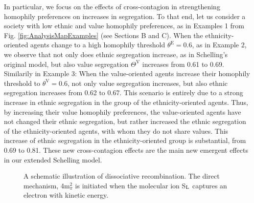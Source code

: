 \documentclass{ws-acs}
\begin{document}
{In particular, we focus on the effects of cross-contagion in strengthening homophily preferences on increases in segregation. To that end, let us consider a society with low ethnic and value homophily preferences, as in Examples 1 from Fig. \ref{fig:AnalysisMapExamples} (see Sections B and C). When the ethnicity-oriented agents change to a high homophily threshold $\theta^\text{E} = 0.6$, as in Example 2, we observe that not only does ethnic segregation increase, as in Schelling's original model, but also value segregation $\Theta^\text{V}$ increases from 0.61 to 0.69. 
Similarily in Example 3: When the value-oriented agents increase their homophily threshold to $\theta^\text{V} = 0.6$, not only value segregation increases, but also ethnic segregation increases from 0.62 to 0.67. This scenario is entirely due to a strong increase in ethnic segregation in the group of the ethnicity-oriented agents. Thus, by increasing their value homophily preferences, the value-oriented agents have not changed their ethnic segregation, but rather increased the ethnic segregation of the ethnicity-oriented agents, with whom they do not share values. This increase of ethnic segregation in the ethnicity-oriented group is substantial, from 0.69 to 0.81. These new cross-contagion effects are the main new emergent effects in our extended Schelling model.

\begin{figure}[th]
\centerline{}
\vspace*{8pt}
\caption{A schematic illustration of dissociative recombination. The
direct mechanism, 4m$^2_\pi$ is initiated when the molecular ion
S$_{\rm L}$ captures an electron with kinetic energy.}
\label{fig:Segregation}
\end{figure}



}
\end{document}
